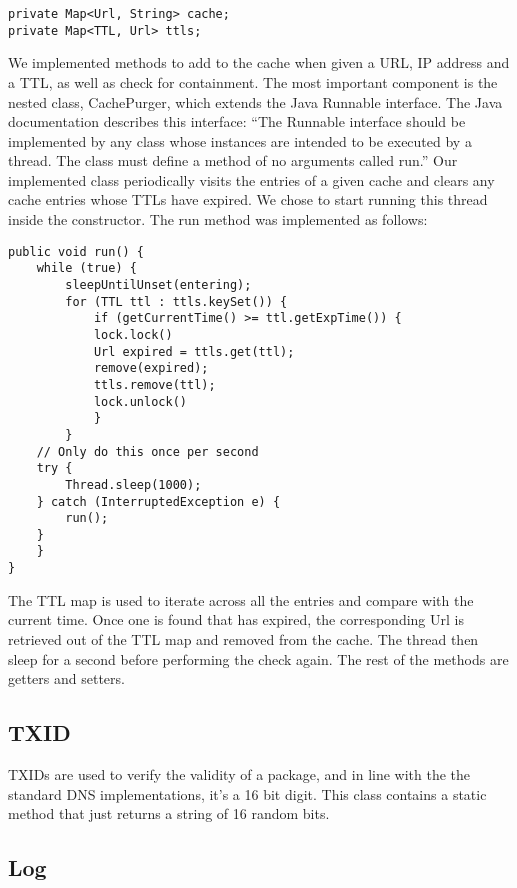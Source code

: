\documentclass[a4paper, 12pt]{article} %
\begin{document}
\begin{lstlisting}
private Map<Url, String> cache;
private Map<TTL, Url> ttls;
\end{lstlisting}

We implemented methods to add to the cache when given a URL, IP address and a TTL, as well as check for containment. The most important component is the nested class, CachePurger, which extends the Java Runnable interface. The Java documentation describes this interface: “The Runnable interface should be implemented by any class whose instances are intended to be executed by a thread. The class must define a method of no arguments called run.” Our implemented class periodically visits the entries of a given cache and clears any cache entries whose TTLs have expired. We chose to start running this thread inside the constructor. The run method was implemented as follows:

\begin{lstlisting}
public void run() {
    while (true) {
	    sleepUntilUnset(entering);
        for (TTL ttl : ttls.keySet()) {
            if (getCurrentTime() >= ttl.getExpTime()) {
            lock.lock()
            Url expired = ttls.get(ttl);
            remove(expired);
            ttls.remove(ttl);
            lock.unlock()
            }
        }
    // Only do this once per second
    try {
        Thread.sleep(1000);
    } catch (InterruptedException e) {
        run();
    }
    }
}
\end{lstlisting}

The TTL map is used to iterate across all the entries and compare with the current time. Once one is found that has expired, the corresponding Url is retrieved out of the TTL map and removed from the cache. The thread then sleep for a second before performing the check again. The rest of the methods are getters and setters. 

\subsection*{TXID}

TXIDs are used to verify the validity of a package, and in line with the the standard DNS implementations, it’s a 16 bit digit. This class contains a static method that just returns a string of 16 random bits.  

\subsection*{Log}
\end{document}
